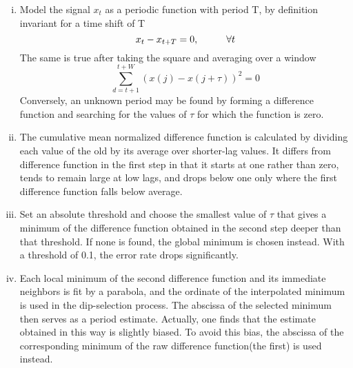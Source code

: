\begin{enumerate}[(i)]
        \item Model the signal $x_t$ as a periodic function with period T, by definition invariant for a time shift
                of T
                \begin{equation}
                        x_t - x_{t+T} = 0,\hspace{10mm}\forall t
                \end{equation}
                The same is true after taking the square and averaging over a window
                \begin{equation}
                        \sum_{d=t+1}^{t+W}{(x(j)-x(j+\tau))^2} = 0
                \end{equation}
                    Conversely, an unknown period may be found by forming a difference function and searching for 
                    the values of $\tau$ for which the function is zero.
            \item The cumulative mean normalized difference function is calculated by dividing each value of the old 
                    by its average over shorter-lag values. It differs from difference function in the first step in that it 
                    starts at one rather than zero, tends to remain large at low lags, and drops below one only where the first 
                    difference function falls below average. 
            \item Set an absolute threshold and choose the smallest value of $\tau$ that gives a minimum of the  
                    difference function obtained in the second step deeper than that threshold. If none is found, the 
                    global minimum is chosen instead. With a threshold of 0.1, the error rate drops significantly. 
            \item Each local minimum of the second difference function and its immediate neighbors is fit by a 
                    parabola, and the ordinate of the interpolated minimum is used in the dip-selection process. The 
                    abscissa of the selected minimum then serves as a period estimate. Actually, one finds that the 
                    estimate obtained in this way is slightly biased. To avoid this bias, the abscissa of the corresponding 
                    minimum of the raw difference function(the first) is used instead. 
\end{enumerate}

